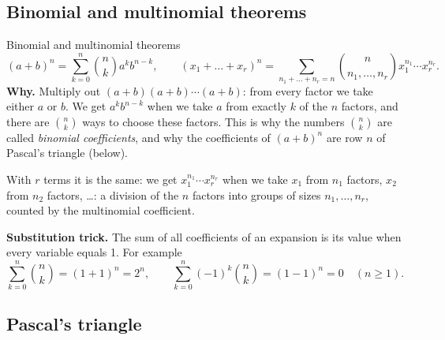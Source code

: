 \subsection*{Binomial and multinomial theorems}

\begin{key}{Binomial and multinomial theorems}
	\[ (a+b)^n=\sum_{k=0}^n\binom nk a^kb^{n-k},\qquad
		(x_1+\dots+x_r)^n=\sum_{n_1+\dots+n_r=n}\binom{n}{n_1,\dots,n_r}
		x_1^{n_1}\cdots x_r^{n_r}. \]
	\textbf{Why.} Multiply out $(a+b)(a+b)\cdots(a+b)$: from every factor we
	take either $a$ or $b$. We get $a^kb^{n-k}$ when we take $a$ from exactly
	$k$ of the $n$ factors, and there are $\binom nk$ ways to choose these
	factors. This is why the numbers $\binom nk$ are called \emph{binomial
		coefficients}, and why the coefficients of $(a+b)^n$ are row $n$ of
	Pascal's triangle (below).

	With $r$ terms it is the same: we get $x_1^{n_1}\cdots x_r^{n_r}$ when we
	take $x_1$ from $n_1$ factors, $x_2$ from $n_2$ factors, \dots: a division
	of the $n$ factors into groups of sizes $n_1,\dots,n_r$, counted by the
	multinomial coefficient.

	\textbf{Substitution trick.} The sum of all coefficients of an expansion is
	its value when every variable equals 1. For example
	\[ \sum_{k=0}^n\binom nk=(1+1)^n=2^n,\qquad
		\sum_{k=0}^n(-1)^k\binom nk=(1-1)^n=0\quad(n\ge1). \]
\end{key}

\subsection*{Pascal's triangle}

